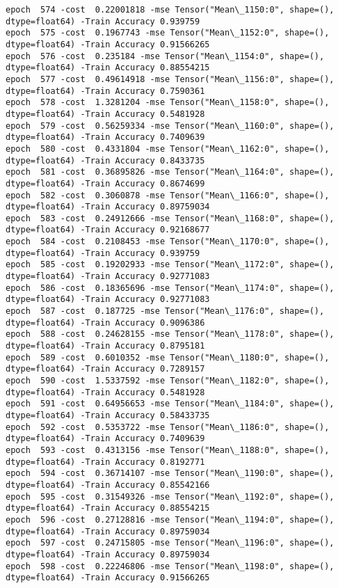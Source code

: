 \documentclass[11pt]{article}
\begin{document}
\begin{Verbatim}[commandchars=\\\{\}]
epoch  574 -cost  0.22001818 -mse Tensor("Mean\_1150:0", shape=(), dtype=float64) -Train Accuracy 0.939759
epoch  575 -cost  0.1967743 -mse Tensor("Mean\_1152:0", shape=(), dtype=float64) -Train Accuracy 0.91566265
epoch  576 -cost  0.235184 -mse Tensor("Mean\_1154:0", shape=(), dtype=float64) -Train Accuracy 0.88554215
epoch  577 -cost  0.49614918 -mse Tensor("Mean\_1156:0", shape=(), dtype=float64) -Train Accuracy 0.7590361
epoch  578 -cost  1.3281204 -mse Tensor("Mean\_1158:0", shape=(), dtype=float64) -Train Accuracy 0.5481928
epoch  579 -cost  0.56259334 -mse Tensor("Mean\_1160:0", shape=(), dtype=float64) -Train Accuracy 0.7409639
epoch  580 -cost  0.4331804 -mse Tensor("Mean\_1162:0", shape=(), dtype=float64) -Train Accuracy 0.8433735
epoch  581 -cost  0.36895826 -mse Tensor("Mean\_1164:0", shape=(), dtype=float64) -Train Accuracy 0.8674699
epoch  582 -cost  0.3060878 -mse Tensor("Mean\_1166:0", shape=(), dtype=float64) -Train Accuracy 0.89759034
epoch  583 -cost  0.24912666 -mse Tensor("Mean\_1168:0", shape=(), dtype=float64) -Train Accuracy 0.92168677
epoch  584 -cost  0.2108453 -mse Tensor("Mean\_1170:0", shape=(), dtype=float64) -Train Accuracy 0.939759
epoch  585 -cost  0.19202933 -mse Tensor("Mean\_1172:0", shape=(), dtype=float64) -Train Accuracy 0.92771083
epoch  586 -cost  0.18365696 -mse Tensor("Mean\_1174:0", shape=(), dtype=float64) -Train Accuracy 0.92771083
epoch  587 -cost  0.187725 -mse Tensor("Mean\_1176:0", shape=(), dtype=float64) -Train Accuracy 0.9096386
epoch  588 -cost  0.24628155 -mse Tensor("Mean\_1178:0", shape=(), dtype=float64) -Train Accuracy 0.8795181
epoch  589 -cost  0.6010352 -mse Tensor("Mean\_1180:0", shape=(), dtype=float64) -Train Accuracy 0.7289157
epoch  590 -cost  1.5337592 -mse Tensor("Mean\_1182:0", shape=(), dtype=float64) -Train Accuracy 0.5481928
epoch  591 -cost  0.64956653 -mse Tensor("Mean\_1184:0", shape=(), dtype=float64) -Train Accuracy 0.58433735
epoch  592 -cost  0.5353722 -mse Tensor("Mean\_1186:0", shape=(), dtype=float64) -Train Accuracy 0.7409639
epoch  593 -cost  0.4313156 -mse Tensor("Mean\_1188:0", shape=(), dtype=float64) -Train Accuracy 0.8192771
epoch  594 -cost  0.36714107 -mse Tensor("Mean\_1190:0", shape=(), dtype=float64) -Train Accuracy 0.85542166
epoch  595 -cost  0.31549326 -mse Tensor("Mean\_1192:0", shape=(), dtype=float64) -Train Accuracy 0.88554215
epoch  596 -cost  0.27128816 -mse Tensor("Mean\_1194:0", shape=(), dtype=float64) -Train Accuracy 0.89759034
epoch  597 -cost  0.24715805 -mse Tensor("Mean\_1196:0", shape=(), dtype=float64) -Train Accuracy 0.89759034
epoch  598 -cost  0.22246806 -mse Tensor("Mean\_1198:0", shape=(), dtype=float64) -Train Accuracy 0.91566265

\end{Verbatim}
\end{document}
